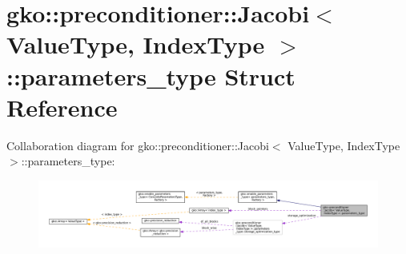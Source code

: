 \hypertarget{structgko_1_1preconditioner_1_1Jacobi_1_1parameters__type}{}\section{gko\+:\+:preconditioner\+:\+:Jacobi$<$ Value\+Type, Index\+Type $>$\+:\+:parameters\+\_\+type Struct Reference}
\label{structgko_1_1preconditioner_1_1Jacobi_1_1parameters__type}


Collaboration diagram for gko\+:\+:preconditioner\+:\+:Jacobi$<$ Value\+Type, Index\+Type $>$\+:\+:parameters\+\_\+type\+:
\nopagebreak
\begin{figure}[H]
\begin{center}
\leavevmode
\includegraphics[width=350pt]{structgko_1_1preconditioner_1_1Jacobi_1_1parameters__type__coll__graph}
\end{center}
\end{figure}
